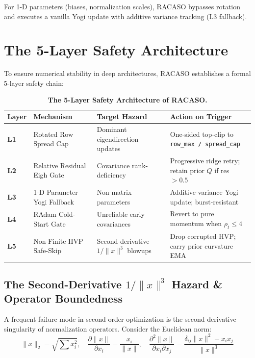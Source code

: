 \documentclass[11pt,a4paper]{article}
\begin{document}
For 1-D parameters (biases, normalization scales), RACASO bypasses rotation and executes a vanilla Yogi update with additive variance tracking (L3 fallback).

\section{The 5-Layer Safety Architecture}

To ensure numerical stability in deep architectures, RACASO establishes a formal 5-layer safety chain:

\begin{table}[h!]
\centering
\small
\begin{tabularx}{\textwidth}{@{}llXX@{}}
\toprule
\textbf{Layer} & \textbf{Mechanism} & \textbf{Target Hazard} & \textbf{Action on Trigger} \\ \midrule
\textbf{L1} & Rotated Row Spread Cap & Dominant eigendirection updates & One-sided top-clip to \texttt{row\_max / spread\_cap} \\
\textbf{L2} & Relative Residual Eigh Gate & Covariance rank-deficiency & Progressive ridge retry; retain prior $Q$ if res $> 0.5$ \\
\textbf{L3} & 1-D Parameter Yogi Fallback & Non-matrix parameters & Additive-variance Yogi update; burst-resistant \\
\textbf{L4} & RAdam Cold-Start Gate & Unreliable early covariances & Revert to pure momentum when $\rho_t \le 4$ \\
\textbf{L5} & Non-Finite HVP Safe-Skip & Second-derivative $1/\|x\|^3$ blowups & Drop corrupted HVP; carry prior curvature EMA \\ \bottomrule
\end{tabularx}
\caption{\textbf{The 5-Layer Safety Architecture of RACASO.}}
\label{tab:safety_layers}
\end{table}

\subsection{\texorpdfstring{The Second-Derivative $1/\|x\|^3$ Hazard \& Operator Boundedness}{The Second-Derivative Hazard and Operator Boundedness}}

A frequent failure mode in second-order optimization is the second-derivative singularity of normalization operators. Consider the Euclidean norm:
\begin{equation}
\|x\|_2 = \sqrt{\sum x_i^2}, \quad \frac{\partial \|x\|}{\partial x_i} = \frac{x_i}{\|x\|}, \quad \frac{\partial^2 \|x\|}{\partial x_i \partial x_j} = \frac{\delta_{ij}\|x\|^2 - x_i x_j}{\|x\|^3}
\end{equation}
\end{document}
